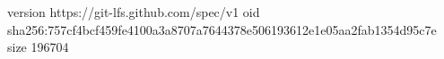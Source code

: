 version https://git-lfs.github.com/spec/v1
oid sha256:757cf4bcf459fe4100a3a8707a7644378e506193612e1e05aa2fab1354d95c7e
size 196704
